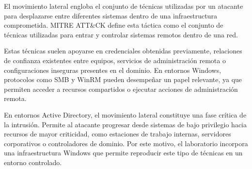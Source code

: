 El movimiento lateral engloba el conjunto de técnicas utilizadas por un atacante para desplazarse entre diferentes sistemas dentro de una infraestructura comprometida. MITRE ATT\&CK define esta táctica como el conjunto de técnicas utilizadas para entrar y controlar sistemas remotos dentro de una red.

Estas técnicas suelen apoyarse en credenciales obtenidas previamente, relaciones de confianza existentes entre equipos, servicios de administración remota o configuraciones inseguras presentes en el dominio. En entornos Windows, protocolos como SMB y WinRM pueden desempeñar un papel relevante, ya que permiten acceder a recursos compartidos o ejecutar acciones de administración remota.

En entornos Active Directory, el movimiento lateral constituye una fase crítica de la intrusión. Permite al atacante progresar desde sistemas de bajo privilegio hacia recursos de mayor criticidad, como estaciones de trabajo internas, servidores corporativos o controladores de dominio. Por este motivo, el laboratorio incorpora una infraestructura Windows que permite reproducir este tipo de técnicas en un entorno controlado.
